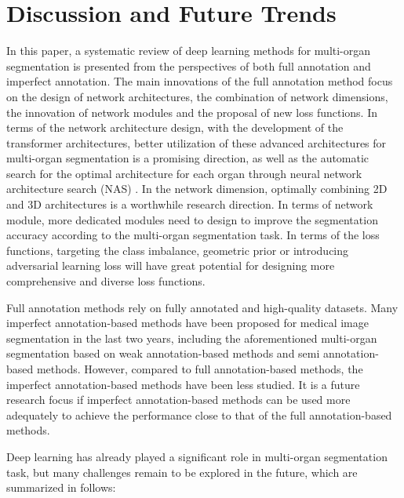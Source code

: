 \documentclass[lettersize,journal]{IEEEtran}
\begin{document}
\section{Discussion and Future Trends}
\label{sec6}
In this paper, a systematic review of deep learning methods for multi-organ segmentation is presented from the perspectives of both full annotation and imperfect annotation. The main innovations of the full annotation method focus on the design of network architectures, the combination of network dimensions, the innovation of network modules and the proposal of new loss functions. In terms of the network architecture design, with the development of the transformer \cite{114} architectures, better utilization of these advanced architectures for multi-organ segmentation is a promising direction, as well as the automatic search for the optimal architecture for each organ through neural network architecture search (NAS) \cite{212}. In the network dimension, optimally combining 2D and 3D architectures is a worthwhile research direction. In terms of network module, more dedicated modules need to design to improve the segmentation accuracy according to the multi-organ segmentation task. In terms of the loss functions, targeting the class imbalance, geometric prior or introducing adversarial learning loss will have great potential for designing more comprehensive and diverse loss functions.

Full annotation methods rely on fully annotated and high-quality datasets. Many imperfect annotation-based methods have been proposed for medical image segmentation in the last two years, including the aforementioned multi-organ segmentation based on weak annotation-based methods and semi annotation-based methods. However, compared to full annotation-based methods, the imperfect annotation-based methods have been less studied. It is a future research focus if imperfect annotation-based methods can be used more adequately to achieve the performance close to that of the full annotation-based methods.

Deep learning has already played a significant role in multi-organ segmentation task, but many challenges remain to be explored in the future, which are summarized in follows:
\end{document}
